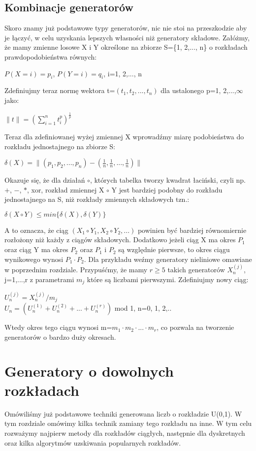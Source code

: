 \documentclass[a4paper]{scrartcl}
\begin{document}
\subsection{Kombinacje generatorów}
Skoro znamy już podstawowe typy generatorów, nic nie stoi na przeszkodzie aby je łączyć, w celu uzyskania lepszych własności niż generatory składowe. Załóżmy, że mamy zmienne losowe X i Y określone na zbiorze S=\{1, 2,..., n\} o rozkładach prawdopodobieństwa równych:
\begin{center}
$P(X=i)=p_i$, $P(Y=i)=q_i$, i=1, 2,..., n
\end{center}
Zdefiniujmy teraz normę wektora t=$(t_1, t_2,..., t_n)$ dla ustalonego p=1, 2,...,$\infty$ jako:
\begin{center}
$\|t\|=(\sum_{i=1}^nt_i^p)^\frac{1}{p}$
\end{center}
Teraz dla zdefiniowanej wyżej zmiennej X wprowadźmy miarę podobieństwa do rozkładu jednostajnego na zbiorze S:
\begin{center}
$\delta (X)=\|(p_1, p_2,..., p_n) - (\frac{1}{n}, \frac{1}{n}, ..., \frac{1}{n})\|$
\end{center}
Okazuje się, że dla działań $\circ$, których tabelka tworzy kwadrat łaciński, czyli np. $+$, $-$, $*$, xor, rozkład zmiennej X $\circ$ Y jest bardziej podobny do rozkładu jednostajnego na S, niż rozkłady zmiennych składowych tzn.:
\begin{center}
$\delta (X \circ Y) \leq min\{\delta (X), \delta (Y)\}$
\end{center}
A to oznacza, że ciąg $(X_1 \circ Y_1, X_2 \circ Y_2,...)$ powinien być bardziej równomiernie rozłożony niż każdy z ciągów składowych. Dodatkowo jeżeli ciąg X ma okres $P_1$ oraz ciąg Y ma okres $P_2$ oraz $P_1$ i $P_2$ są względnie pierwsze, to okres ciągu wynikowego wynosi $P_1\cdot P_2$. Dla przykładu weźmy generatory nieliniowe omawiane w poprzednim rozdziale. Przypuśćmy, że mamy $r\geq 5$ takich generatorów $X_n^{(j)}$, j=1,...,r z parametrami $m_j$ które są liczbami pierwszymi. Zdefiniujmy nowy ciąg:
\begin{center}
$U_n^{(j)}=X_n^{(j)}/m_j$\\
$U_n=(U_n^{(1)} + U_n^{(2)} + ... + U_n^{(r)})$ mod 1, n=0, 1, 2,..
\end{center}
Wtedy okres tego ciągu wynosi m=$m_1\cdot m_2 \cdot ... \cdot m_r$, co pozwala na tworzenie generatorów o bardzo duży okresach.
\section{Generatory o dowolnych rozkładach}
\qquad Omówiliśmy już podstawowe techniki generowana liczb o rozkładzie U(0,1). W tym rozdziale omówimy kilka technik zamiany tego rozkładu na inne. W tym celu rozważymy najpierw metody dla rozkładów ciągłych, następnie dla dyskretnych oraz kilka algorytmów uzskiwania popularnych rozkładów.
\end{document}
